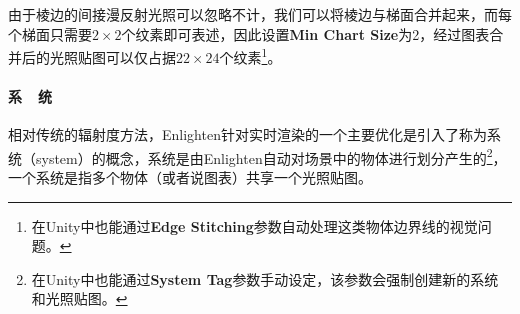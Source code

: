 由于棱边的间接漫反射光照可以忽略不计，我们可以将棱边与梯面合并起来，而每个梯面只需要$2\times 2$个纹素即可表述，因此设置\textbf{Min Chart Size}为2，经过图表合并后的光照贴图可以仅占据$22\times 24$个纹素\footnote{在Unity中也能通过\textbf{Edge Stitching}参数自动处理这类物体边界线的视觉问题。}。




\paragraph{系~~统}
相对传统的辐射度方法，Enlighten针对实时渲染的一个主要优化是引入了称为系统（system）的概念，系统是由Enlighten自动对场景中的物体进行划分产生的\footnote{在Unity中也能通过\textbf{System Tag}参数手动设定，该参数会强制创建新的系统和光照贴图。}，一个系统是指多个物体（或者说图表）共享一个光照贴图。

